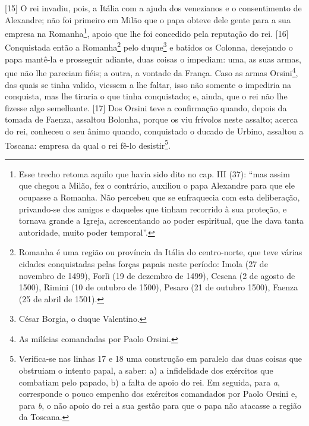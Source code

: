 {[}15{]} O rei invadiu, pois, a Itália com a ajuda dos venezianos e o
consentimento de Alexandre; não foi primeiro em Milão que o papa obteve
dele gente para a sua empresa na Romanha\footnote{Esse trecho retoma
  aquilo que havia sido dito no cap. III (37): ``mas assim que chegou a
  Milão, fez o contrário, auxiliou o papa Alexandre para que ele
  ocupasse a Romanha. Não percebeu que se enfraquecia com esta
  deliberação, privando-se dos amigos e daqueles que tinham recorrido à
  sua proteção, e tornava grande a Igreja, acrescentando ao poder
  espiritual, que lhe dava tanta autoridade, muito poder temporal''.},
apoio que lhe foi concedido pela reputação do rei. {[}16{]} Conquistada
então a Romanha\footnote{Romanha é uma região ou província da Itália do
  centro-norte, que teve várias cidades conquistadas pelas forças papais
  neste período: Imola (27 de novembro de 1499), Forlì (19 de dezembro
  de 1499), Cesena (2 de agosto de 1500), Rimini (10 de outubro de
  1500), Pesaro (21 de outubro 1500), Faenza (25 de abril de 1501).}
pelo duque\footnote{César Borgia, o duque Valentino.} e batidos os
Colonna, desejando o papa mantê-la e prosseguir adiante, duas coisas o
impediam: uma, as suas armas, que não lhe pareciam fiéis; a outra, a
vontade da França. Caso as armas Orsini\footnote{As milícias comandadas
  por Paolo Orsini.}, das quais se tinha valido, viessem a lhe faltar,
isso não somente o impediria na conquista, mas lhe tiraria o que tinha
conquistado; e, ainda, que o rei não lhe fizesse algo semelhante.
{[}17{]} Dos Orsini teve a confirmação quando, depois da tomada de
Faenza, assaltou Bolonha, porque os viu frívolos neste assalto; acerca
do rei, conheceu o seu ânimo quando, conquistado o ducado de Urbino,
assaltou a Toscana: empresa da qual o rei fê-lo desistir\footnote{Verifica-se
  nas linhas 17 e 18 uma construção em paralelo das duas coisas que
  obstruiam o intento papal, a saber: a) a infidelidade dos exércitos
  que combatiam pelo papado, b) a falta de apoio do rei. Em seguida,
  para \emph{a}, corresponde o pouco empenho dos exércitos comandados
  por Paolo Orsini e, para \emph{b}, o não apoio do rei a sua gestão
  para que o papa não atacasse a região da Toscana.}.

